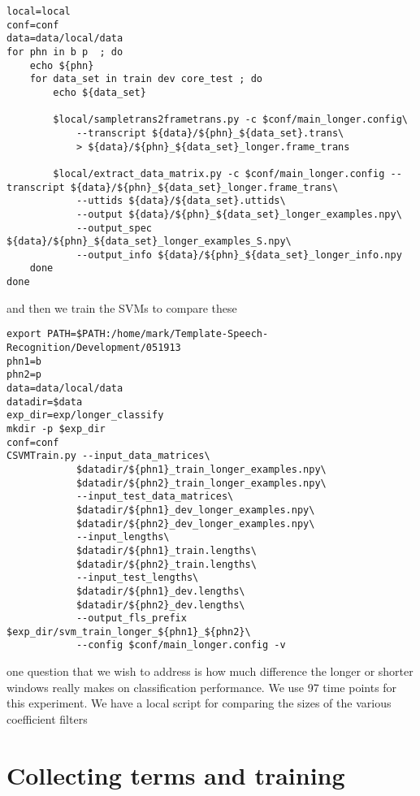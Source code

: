 \documentclass{article}
\begin{document}
\begin{verbatim}
local=local
conf=conf
data=data/local/data
for phn in b p  ; do
    echo ${phn}
    for data_set in train dev core_test ; do
        echo ${data_set}

        $local/sampletrans2frametrans.py -c $conf/main_longer.config\
            --transcript ${data}/${phn}_${data_set}.trans\
            > ${data}/${phn}_${data_set}_longer.frame_trans

        $local/extract_data_matrix.py -c $conf/main_longer.config --transcript ${data}/${phn}_${data_set}_longer.frame_trans\
            --uttids ${data}/${data_set}.uttids\
            --output ${data}/${phn}_${data_set}_longer_examples.npy\
            --output_spec ${data}/${phn}_${data_set}_longer_examples_S.npy\
            --output_info ${data}/${phn}_${data_set}_longer_info.npy
    done
done

\end{verbatim}
and then we train the SVMs to compare these
\begin{verbatim}
export PATH=$PATH:/home/mark/Template-Speech-Recognition/Development/051913
phn1=b
phn2=p
data=data/local/data
datadir=$data
exp_dir=exp/longer_classify
mkdir -p $exp_dir
conf=conf
CSVMTrain.py --input_data_matrices\
            $datadir/${phn1}_train_longer_examples.npy\
            $datadir/${phn2}_train_longer_examples.npy\
            --input_test_data_matrices\
            $datadir/${phn1}_dev_longer_examples.npy\
            $datadir/${phn2}_dev_longer_examples.npy\
            --input_lengths\
            $datadir/${phn1}_train.lengths\
            $datadir/${phn2}_train.lengths\
            --input_test_lengths\
            $datadir/${phn1}_dev.lengths\
            $datadir/${phn2}_dev.lengths\
            --output_fls_prefix $exp_dir/svm_train_longer_${phn1}_${phn2}\
            --config $conf/main_longer.config -v
\end{verbatim}
one question that we wish to address is how much difference the longer
or shorter windows really makes on classification performance.
We use 97 time points for this experiment.
We have a local script for comparing the sizes of the various
coefficient filters


\section{Collecting terms and training}
\end{document}
